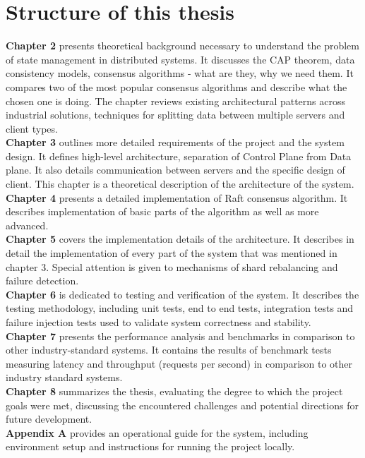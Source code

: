 \documentclass[shortabstract]{iithesis}
\begin{document}
\section{Structure of this thesis}

\textbf{Chapter 2} presents theoretical background necessary to understand the problem of state management in distributed systems. It discusses the CAP theorem, data consistency models, consensus algorithms - what are they, why we need them. It compares two of the most popular consensus algorithms and describe what the chosen one is doing. The chapter reviews existing architectural patterns across industrial solutions, techniques for splitting data between multiple servers and client types. \\
\textbf{Chapter 3} outlines more detailed requirements of the project and the system design. It defines high-level architecture, separation of Control Plane from Data plane. It also details communication between servers and the specific design of client. This chapter is a theoretical description of the architecture of the system. \\
\textbf{Chapter 4} presents a detailed implementation of Raft consensus algorithm. It describes implementation of basic parts of the algorithm as well as more advanced. \\
\textbf{Chapter 5} covers the implementation details of the architecture. It describes in detail the implementation of every part of the system that was mentioned in chapter 3. Special attention is given to mechanisms of shard rebalancing and failure detection. \\
\textbf{Chapter 6} is dedicated to testing and verification of the system. It describes the testing methodology, including unit tests, end to end tests, integration tests and failure injection tests used to validate system correctness and stability. \\
\textbf{Chapter 7} presents the performance analysis and benchmarks in comparison to other industry-standard systems. It contains the results of benchmark tests measuring latency and throughput (requests per second) in comparison to other industry standard systems. \\
\textbf{Chapter 8} summarizes the thesis, evaluating the degree to which the project goals were met, discussing the encountered challenges and potential directions for future development. \\
\textbf{Appendix A} provides an operational guide for the system, including environment setup and instructions for running the project locally.
\end{document}
